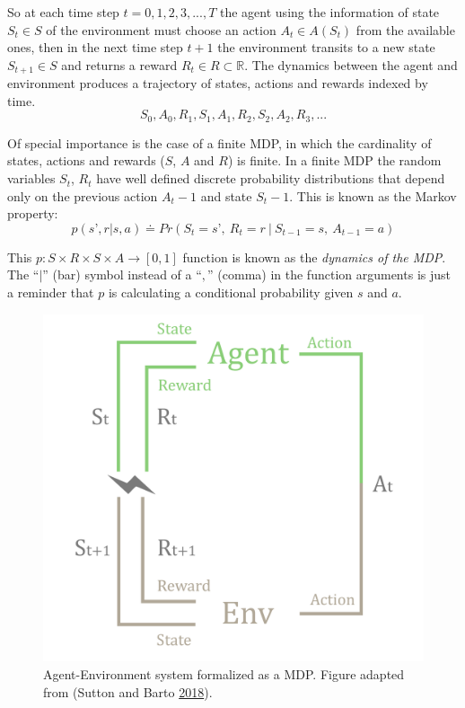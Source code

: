 \documentclass[
]{book}
\begin{document}
So at each time step \(t=0,1,2,3,...,T\) the agent using the information of state \(S_t \in S\) of the environment must choose an action \(A_t \in A(S_t)\) from the available ones, then in the next time step \(t+1\) the environment transits to a new state \(S_{t+1} \in S\) and returns a reward \(R_t \in R \subset \mathds{R}\). The dynamics between the agent and environment produces a trajectory of states, actions and rewards indexed by time.
\[ S_0, A_0, R_1, S_1, A_1, R_2, S_2, A_2, R_3, ...\]

Of special importance is the case of a finite MDP, in which the cardinality of states, actions and rewards (\(S\), \(A\) and \(R\)) is finite. In a finite MDP the random variables \(S_t\), \(R_t\) have well defined discrete probability distributions that depend only on the previous action \(A_t-1\) and state \(S_t-1\). This is known as the Markov property:
\[ p(s’, r | s, a) \doteq Pr(S_t=s’,\ R_t=r\ |\ S_{t-1}=s,\ A_{t-1}=a) \]

This \(p: S \times R \times S \times A \rightarrow [0,1]\) function is known as the \emph{dynamics of the MDP}. The ``\(|\)'' (bar) symbol instead of a ``\(,\)'' (comma) in the function arguments is just a reminder that \(p\) is calculating a conditional probability given \(s\) and \(a\).



\begin{figure}

{\centering \includegraphics[width=0.8\linewidth]{pics/agent-env} 

}

\caption{Agent-Environment system formalized as a MDP. Figure adapted from (Sutton and Barto \protect\hyperlink{ref-sutton2018reinforcement}{2018}).}\label{fig:env-agent-interactions}
\end{figure}
\end{document}
